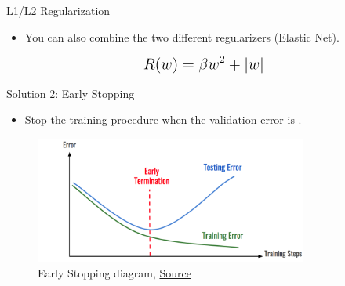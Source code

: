 \begin{frame}{L1/L2 Regularization}
    \begin{itemize}
        \item You can also combine the two different regularizers (Elastic Net).
    \end{itemize}
	\vspace{0.05\textheight}
    \begin{equation*}
        \mathlarger{\mathlarger{
        R(w) = \beta w^2 + \vert w\vert
        }}
    \end{equation*}
\end{frame}

\begin{frame}{Solution 2: Early Stopping}
    \begin{itemize}
        \item Stop the training procedure when the validation error is .
    \end{itemize}
	\vspace{0.1\textheight}
    \begin{figure}
	\centering
	\includegraphics[width=0.8\textwidth]{Figs/Early Stopping.png}
	\caption{Early Stopping diagram, \href{https://medium.com/analytics-v7idhya/early-stopping-with-pytorch-to-restrain-your-model-from-overfitting-dce6de4081c5}{Source}}
    \end{figure}
\end{frame}

